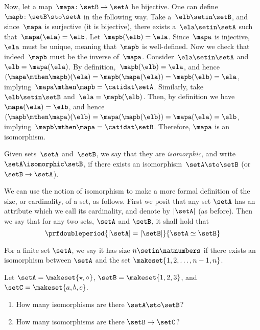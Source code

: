 \begin{solution}
    Now, let a map~$\mapa\colon \setB \to \setA$ be bijective.
    One can define~$\mapb\colon \setB \sto \setA$ in the following way.
    Take a~$\elb\setin\setB$, and since~$\mapa$ is surjective (it is bijective), there exists a~$\ela\setin\setA$ such that~$\mapa(\ela)=\elb$.
    Let~$\mapb(\elb)=\ela$.
    Since~$\mapa$ is injective,~$\ela$ must be unique, meaning that~$\mapb$ is well-defined.
    Now we check that indeed~$\mapb$ must be the inverse of~$\mapa$.
    Consider~$\ela \setin\setA$ and~$\elb=\mapa(\ela)$.
    By definition,~$\mapb(\elb)=\ela$, and hence~$(\mapa\mthen \mapb)(\ela)=\mapb(\mapa(\ela))=\mapb(\elb)=\ela$, implying~$\mapa\mthen \mapb=\catidat\setA$.
    Similarly, take~$\elb\setin\setB$ and~$\ela=\mapb(\elb)$.
    Then, by definition we have~$\mapa(\ela)=\elb$, and hence~$(\mapb\mthen \mapa)(\elb)=\mapa(\mapb(\elb))=\mapa(\ela)=\elb$, implying~$\mapb\mthen \mapa=\catidat\setB$.
    Therefore, $\mapa$ is an isomorphism.
\end{solution}

\begin{ctdefinition}
    Given sets~$\setA$ and~$\setB$, we say that they are \emph{isomorphic}, and write~$\setA \isomorphic \setB$,
    if there exists an isomorphism~$\setA \sto \setB$ (or~$\setB \to \setA$).
\end{ctdefinition}

We can use the notion of isomorphism to make a more formal definition of the size, or cardinality, of a set, as follows.
First we posit that any set $\setA$ has an attribute which we call its cardinality, and denote by $\vert \setA \vert$ (as before).
Then we say that for any two sets, $\setA$ and $\setB$, it shall hold that
\begin{equation}
    \prfdoubleperiod{ \vert \setA \vert = \vert \setB \vert }{ \setA \simeq \setB }
\end{equation}

For a finite set $\setA$, we say it has size $n \setin \natnumbers$ if there exists an isomorphism between $\setA$ and the set $\makeset{1,2, \dots, n-1, n}$.

\begin{gradedexercise}
    \label{ex:CountingIsos}

    Let $\setA = \makeset{\star, \circ }$, $\setB = \makeset{1, 2, 3}$, and $\setC = \makeset{a, b, c}$.
    \begin{enumerate}
        \item How many isomorphisms are there $\setA \sto \setB$?
        \item How many isomorphisms are there $\setB \to \setC$?
    \end{enumerate}
\end{gradedexercise}

